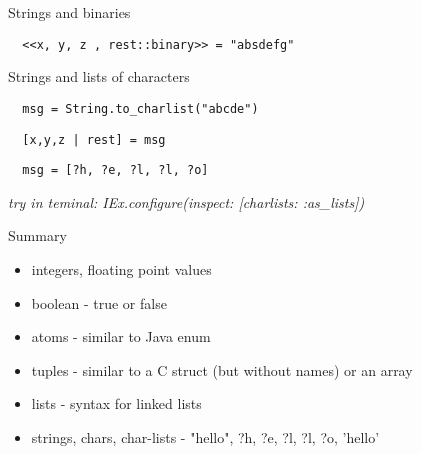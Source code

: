 \begin{frame}[fragile]{Strings and binaries}

\vspace{20pt}  \pause
\begin{verbatim}  
  <<x, y, z , rest::binary>> = "absdefg"
\end{verbatim}  
  
\end{frame}

\begin{frame}[fragile]{Strings and lists of characters}

\vspace{20pt}  \pause  
\begin{verbatim}
  msg = String.to_charlist("abcde")
\end{verbatim}

\vspace{20pt}  \pause
\begin{verbatim}  
  [x,y,z | rest] = msg
\end{verbatim}

\vspace{20pt}  \pause
\begin{verbatim}  
  msg = [?h, ?e, ?l, ?l, ?o]
\end{verbatim}

\vspace{20pt}\pause
 {\em try in teminal:  IEx.configure(inspect: [charlists: :as_lists])}

\end{frame}

\begin{frame}{Summary}

  \begin{itemize}
  \item integers, floating point values \pause
  \item boolean - true or false
  \item atoms - similar to Java enum \pause
  \item tuples - similar to a C struct (but without names) or an array\pause
  \item lists - syntax for linked lists
  \item strings, chars, char-lists  - "hello", ?h, ?e, ?l, ?l, ?o, 'hello'
  \end{itemize}

\end{frame}




